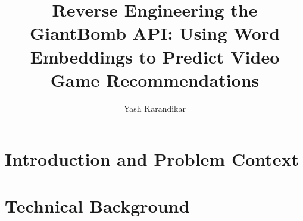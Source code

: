 \documentclass[10pt,twocolumn]{article}
\title{Reverse Engineering the GiantBomb API: Using Word Embeddings to Predict Video Game Recommendations}
\author{Yash Karandikar}
\affiliation{Occidental College}
\begin{document}
\maketitle

 
\section{Introduction and Problem Context}


\begin{comment}
    Why the project is interesting.
    To me:
        - want to gain experience in ML, particularly in setting up a real-world problem (as opposed to problems specifically engineered for textbooks)
        - video games are one of my hobbies, and I have seen the various ways sources of video game-related text can arise (reviews, descriptions, forums, etc.) - use NLP to inform ML model
    To general public:
        - recommender systems are prevalent in today's highly technological society. (Buying things on Amazon, watching content on Netflix, connecting with people on Facebook, professional development on LinkedIn, etc. - all use recommendation systems)
        - supervised learning is becoming part of recommender system infrastructure (particularly for content-based, rather than collaborative filtering-based, aspects)

    Difficulty of project:
    - ML - deciding, obtaining, and preprocessing data in an ethical, efficient way. This is good practice for the real world
    - iterative ML algorithm improvement - how to identify breakpoints and be skeptical of results, then make iterative changes to algorithm to fix results
\end{comment}

\section{Technical Background}

\end{document}
